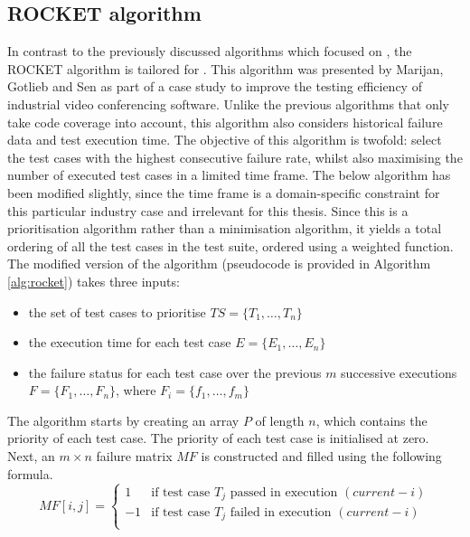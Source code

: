 
\subsection{ROCKET algorithm}
\label{ssec:alg-rocket}
In contrast to the previously discussed algorithms which focused on \tsm{}, the ROCKET algorithm is tailored for \tcp{}. This algorithm was presented by Marijan, Gotlieb and Sen \cite{6676952} as part of a case study to improve the testing efficiency of industrial video conferencing software. Unlike the previous algorithms that only take code coverage into account, this algorithm also considers historical failure data and test execution time. The objective of this algorithm is twofold: select the test cases with the highest consecutive failure rate, whilst also maximising the number of executed test cases in a limited time frame. The below algorithm has been modified slightly, since the time frame is a domain-specific constraint for this particular industry case and irrelevant for this thesis. Since this is a prioritisation algorithm rather than a minimisation algorithm, it yields a total ordering of all the test cases in the test suite, ordered using a weighted function.\\

\noindent The modified version of the algorithm (pseudocode is provided in Algorithm \autoref{alg:rocket}) takes three inputs:
\begin{itemize}
	\item the set of test cases to prioritise $TS = \{T_1, \dots, T_n\}$
	\item the execution time for each test case $E = \{E_1, \dots, E_n\}$
	\item the failure status for each test case over the previous $m$ successive executions $F = \{F_1, \dots, F_n\}$, where $F_i = \{f_1, \dots, f_m\}$
\end{itemize}

\noindent The algorithm starts by creating an array $P$ of length $n$, which contains the priority of each test case. The priority of each test case is initialised at zero. Next, an $m \times n$ failure matrix $MF$ is constructed and filled using the following formula.
\[
MF[i, j] = \left\{
\begin{array}{rl}
	1 & \text{if test case } T_j \text{ passed in execution } (current - i) \\
	-1 & \text{if test case } T_j \text{ failed in execution } (current - i) \\
	\end{array}
\right.
\]

